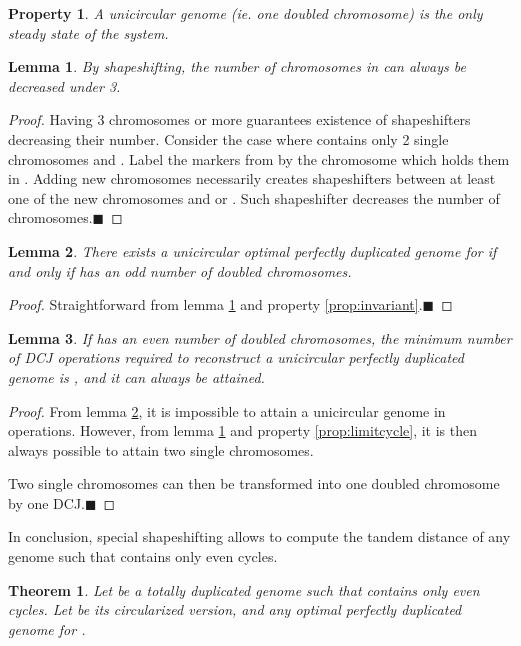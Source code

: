\documentclass[11pt,final,twoside,nofrench]{thlifl}
\newcommand{\qed}{\ensuremath{\blacksquare}}
\newtheorem{property}{Property}
\newtheorem{proof}{Proof}
\newtheorem{theorem}{Theorem}
\newtheorem{lemma}{Lemma}
\begin{document}
{\begin{property}
\label{prop:steadystate}
 A unicircular genome (ie. one doubled chromosome) is the only steady state of the system.
\end{property}

\begin{lemma}
\label{lem:under3}
  By shapeshifting, the number of chromosomes in  can always be decreased under 3.
\end{lemma}

\begin{proof}
Having 3 chromosomes or more guarantees existence of shapeshifters decreasing their number.
Consider the case where  contains only 2 single chromosomes  and . Label the markers from  by the chromosome which holds them in . Adding new chromosomes necessarily creates shapeshifters between at least one of the new chromosomes and  or . Such shapeshifter decreases the number of chromosomes.\qed
\end{proof}

\begin{lemma}
\label{lem:oddCd}
There exists a unicircular optimal perfectly duplicated genome for  if and only if  has an \emph{odd} number of doubled chromosomes.
\end{lemma}
\begin{proof}
Straightforward from lemma \ref{lem:under3} and property \ref{prop:invariant}.\qed
\end{proof}

\begin{lemma}
\label{lem:evenCd}
If  has an \emph{even} number of doubled chromosomes, the minimum number of DCJ operations required to reconstruct a unicircular perfectly duplicated genome is , and it can always be attained.
\end{lemma}
\begin{proof}
From lemma \ref{lem:oddCd}, it is impossible to attain a unicircular genome in  operations. However, from lemma \ref{lem:under3} and property \ref{prop:limitcycle}, it is then always possible to attain two single chromosomes.

Two single chromosomes can then be transformed into one doubled chromosome by one DCJ.\qed
\end{proof}

In conclusion, special shapeshifting allows to compute the tandem distance of any genome  such that  contains only even cycles.
 \begin{theorem}
\label{th:restricted}
Let  be a totally duplicated genome such that  contains only even cycles.
Let  be its circularized version, and  any optimal perfectly duplicated genome for .


\end{theorem}}
\end{document}
